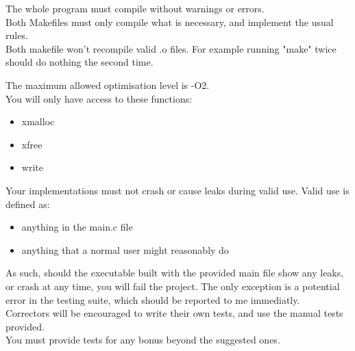 \documentclass{42-en}
\begin{document}
    The whole program must compile without warnings or errors.\\

    Both Makefiles must only compile what is necessary, and implement the usual rules.\\

    Both makefile won't recompile valid .o files. For example running "make" twice should do nothing
    the second time.

    The maximum allowed optimisation level is -O2.\\

    You will only have access to these functions:\\
    \begin{itemize}\itemsep7pt
        \item xmalloc
        \item xfree
        \item write
    \end{itemize}
    

    Your implementations must not crash or cause leaks during valid use. Valid use is defined as:
    \begin{itemize}\itemsep7pt
        \item anything in the main.c file
        \item anything that a normal user might reasonably do
    \end{itemize}

    As such, should the executable built with the provided main file show any leaks,
    or crash at any time, you will fail the project. The only exception is a potential
    error in the testing suite, which should be reported to me immediatly.\\

    Correctors will be encouraged to write their own tests, and use the manual tests provided.\\

    You must provide tests for any bonus beyond the suggested ones.\\
\end{document}
